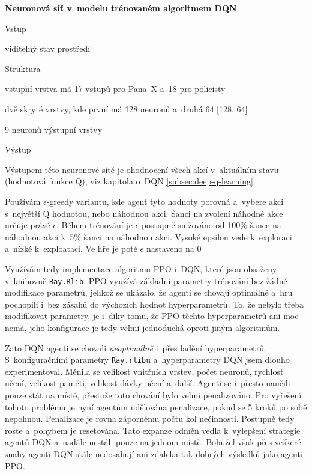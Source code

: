     \textbf{Neuronová síť v~modelu trénovaném algoritmem DQN}
    \begin{myitemize}
      \item Vstup
        \begin{myitemize}
          \item viditelný stav prostředí
        \end{myitemize}
      \item Struktura
        \begin{myitemize}
          \item vstupní vrstva má 17 vstupů pro Pana~X a~18 pro policisty
          \item dvě skryté vrstvy, kde první má 128 neuronů a~druhá 64 [128, 64]
          \item 9 neuronů výstupní vrstvy
        \end{myitemize}
        \pagebreak
      \item Výstup
        \begin{myitemize}
          \item Výstupem této neuronové sítě je ohodnocení všech akcí v~aktuálním stavu (hodnotová funkce Q), viz kapitola o~DQN \ref{subsec:deep-q-learning}.
          \item Používám $\epsilon$-greedy variantu, kde agent tyto hodnoty porovná a~vybere akci s~největší Q hodnotou, nebo náhodnou akci.
          Šanci na zvolení náhodné akce určuje právě $\epsilon$. Během trénování je $\epsilon$ postupně snižováno od 100\% šance na náhodnou akci k~5\% šanci na náhodnou akci.
          Vysoké epsilon vede k~exploraci a~nízké k~exploataci. Ve hře je poté $\epsilon$ nastaveno na 0%
        \end{myitemize}
    \end{myitemize}

  \bigskip

Využívám tedy implementace algoritmu PPO i~DQN, které jsou obsaženy v~knihovně \texttt{Ray.Rlib}.
PPO využívá základní parametry trénování bez žádné modifikace parametrů, jelikož se ukázalo, že agenti se chovají optimálně a~hru pochopili i~bez zásahů do výchozích hodnot hyperparametrů.
To, že nebylo třeba modifikovat parametry, je i~díky tomu, že PPO těchto hyperparametrů ani moc nemá, jeho konfigurace je tedy velmi jednoduchá oproti jiným algoritmům.

Zato DQN agenti se chovali \emph{neoptimálně} i~přes ladění hyperparametrů.
S~konfiguračními parametry \texttt{Ray.rlib}u a~hyperparametry DQN jsem dlouho experimentoval.
Měnila se velikost vnitřních vrstev, počet neuronů, rychlost učení, velikost paměti, velikost dávky učení a~další.
Agenti se i~přesto naučili pouze stát na místě, přestože toto chování bylo velmi penalizováno.
Pro vyřešení tohoto problému je nyní agentům udělována penalizace, pokud se 5 kroků po sobě nepohnou.
Penalizace je rovna zápornému počtu kol nečinnosti.
Postupně tedy roste a~pohybem je resetována.
Tato expanze odměn vedla k~vylepšení strategie agentů DQN a~nadále nestáli pouze na jednom místě.
Bohužel však přes veškeré snahy agenti DQN stále nedosahují ani zdaleka tak dobrých výsledků jako agenti PPO\@.

